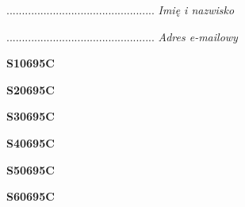 \begin{turn}{90}\begin{minipage}{\linewidth} \vspace{20mm} ................................................  \textit{Imię i nazwisko}\end{minipage}\end{turn}

\begin{turn}{90}\begin{minipage}{\linewidth} \vspace{20mm} ................................................  \textit{Adres e-mailowy}\end{minipage}\end{turn}

\begin{turn}{90}\huge \begin{minipage}{\linewidth} \vspace{10mm}\textbf{S10695C}\end{minipage}\end{turn}

\begin{turn}{90}\huge \begin{minipage}{\linewidth} \vspace{10mm}\textbf{S20695C}\end{minipage}\end{turn}

\begin{turn}{90}\huge \begin{minipage}{\linewidth} \vspace{10mm}\textbf{S30695C}\end{minipage}\end{turn}

\begin{turn}{90}\huge \begin{minipage}{\linewidth} \vspace{10mm}\textbf{S40695C}\end{minipage}\end{turn}

\begin{turn}{90}\huge \begin{minipage}{\linewidth} \vspace{10mm}\textbf{S50695C}\end{minipage}\end{turn}

\begin{turn}{90}\huge \begin{minipage}{\linewidth} \vspace{10mm}\textbf{S60695C}\end{minipage}\end{turn}

